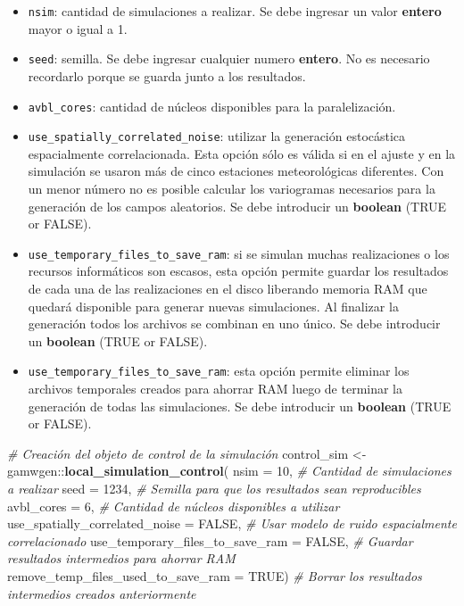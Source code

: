 \documentclass[
  12pt]{article}
\newenvironment{Shaded}{}{}
\newcommand{\CommentTok}[1]{\textcolor[rgb]{0.38,0.63,0.69}{\textit{#1}}}
\newcommand{\DataTypeTok}[1]{\textcolor[rgb]{0.56,0.13,0.00}{#1}}
\newcommand{\DecValTok}[1]{\textcolor[rgb]{0.25,0.63,0.44}{#1}}
\newcommand{\KeywordTok}[1]{\textcolor[rgb]{0.00,0.44,0.13}{\textbf{#1}}}
\newcommand{\NormalTok}[1]{#1}
\newcommand{\OperatorTok}[1]{\textcolor[rgb]{0.40,0.40,0.40}{#1}}
\newcommand{\OtherTok}[1]{\textcolor[rgb]{0.00,0.44,0.13}{#1}}
\newcommand{\StringTok}[1]{\textcolor[rgb]{0.25,0.44,0.63}{#1}}
\providecommand{\tightlist}{%
  \setlength{\itemsep}{0pt}\setlength{\parskip}{0pt}}
\begin{document}
\begin{itemize}
\tightlist
\item
  \texttt{nsim}: cantidad de simulaciones a realizar. Se debe ingresar un valor \textbf{entero} mayor o igual a 1.
\item
  \texttt{seed}: semilla. Se debe ingresar cualquier numero \textbf{entero}. No es necesario recordarlo porque se guarda junto a los resultados.
\item
  \texttt{avbl\_cores}: cantidad de núcleos disponibles para la paralelización.
\item
  \texttt{use\_spatially\_correlated\_noise}: utilizar la generación estocástica espacialmente correlacionada. Esta opción sólo es válida si en el ajuste y en la simulación se usaron más de cinco estaciones meteorológicas diferentes. Con un menor número no es posible calcular los variogramas necesarios para la generación de los campos aleatorios. Se debe introducir un \textbf{boolean} (TRUE or FALSE).
\item
  \texttt{use\_temporary\_files\_to\_save\_ram}: si se simulan muchas realizaciones o los recursos informáticos son escasos, esta opción permite guardar los resultados de cada una de las realizaciones en el disco liberando memoria RAM que quedará disponible para generar nuevas simulaciones. Al finalizar la generación todos los archivos se combinan en uno único. Se debe introducir un \textbf{boolean} (TRUE or FALSE).
\item
  \texttt{use\_temporary\_files\_to\_save\_ram}: esta opción permite eliminar los archivos temporales creados para ahorrar RAM luego de terminar la generación de todas las simulaciones. Se debe introducir un \textbf{boolean} (TRUE or FALSE).
\end{itemize}

\begin{Shaded}
\begin{Highlighting}[]
\CommentTok{# Creación del objeto de control de la simulación}
\NormalTok{control_sim <-}\StringTok{ }\NormalTok{gamwgen}\OperatorTok{::}\KeywordTok{local_simulation_control}\NormalTok{(}
  \DataTypeTok{nsim =} \DecValTok{10}\NormalTok{, }
  \CommentTok{# Cantidad de simulaciones a realizar}
  \DataTypeTok{seed =} \DecValTok{1234}\NormalTok{, }
  \CommentTok{# Semilla para que los resultados sean reproducibles}
  \DataTypeTok{avbl_cores =} \DecValTok{6}\NormalTok{, }
  \CommentTok{# Cantidad de núcleos disponibles a utilizar}
  \DataTypeTok{use_spatially_correlated_noise =} \OtherTok{FALSE}\NormalTok{, }
  \CommentTok{# Usar modelo de ruido espacialmente correlacionado}
  \DataTypeTok{use_temporary_files_to_save_ram =} \OtherTok{FALSE}\NormalTok{, }
  \CommentTok{# Guardar resultados intermedios para ahorrar RAM}
  \DataTypeTok{remove_temp_files_used_to_save_ram =} \OtherTok{TRUE}\NormalTok{) }
  \CommentTok{# Borrar los resultados intermedios creados anteriormente}
\end{Highlighting}
\end{Shaded}
\end{document}
